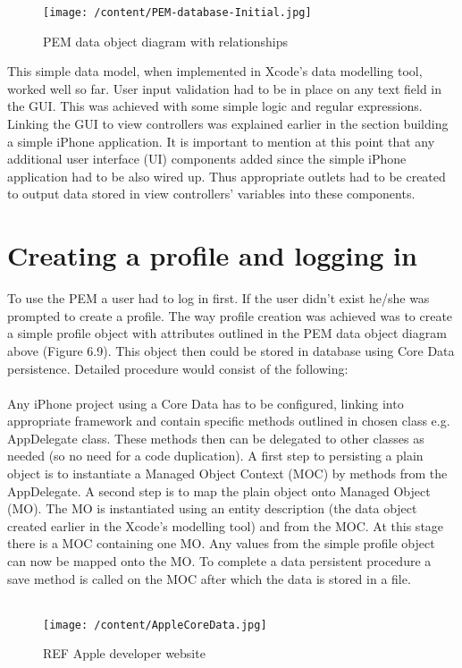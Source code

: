 \documentclass[12pt, a4paper]{report}   %
\begin{document}
\begin{enumerate}
\begin{figure}[H]
  \centering
	\texttt{[image: /content/PEM-database-Initial.jpg]}
	  \caption{PEM data object diagram with relationships}
\end{figure}


This simple data model, when implemented in Xcode's data modelling tool, worked well so far. User input validation had to be in place on any text field in the GUI. This was achieved with some simple logic and regular expressions. Linking the GUI to view controllers was explained earlier in the section building a simple iPhone application. It is important to mention at this point that any additional user interface (UI) components added since the simple iPhone application had to be also wired up. Thus appropriate outlets had to be created to output data stored in view controllers' variables into these components.


\clearpage
\section{Creating a profile and logging in}
To use the PEM a user had to log in first. If the user didn't exist he/she was prompted to create a profile. The way profile creation was achieved was to create a simple profile object with attributes outlined in the PEM data object diagram above (Figure 6.9). This object then could be stored in database using Core Data persistence. Detailed procedure would consist of the following:\\ \\
Any iPhone project using a Core Data has to be configured, linking into appropriate framework and contain specific methods outlined in chosen class e.g. AppDelegate class. These methods then can be delegated to other classes as needed (so no need for a code duplication). A first step to persisting a plain object is to instantiate a Managed Object Context (MOC) by methods from the AppDelegate. A second step is to map the plain object onto Managed Object (MO). The MO is instantiated using an entity description (the data object created earlier in the Xcode's modelling tool) and from the MOC. At this stage there is a MOC containing one MO. Any values from the simple profile object can now be mapped onto the MO. To complete a data persistent procedure a save method is called on the MOC after which the data is stored in a file.\\ \\


\begin{figure}[H]
  \centering
	\texttt{[image: /content/AppleCoreData.jpg]}
	  \caption{REF Apple developer website}
\end{figure}



\end{enumerate}
\end{document}
